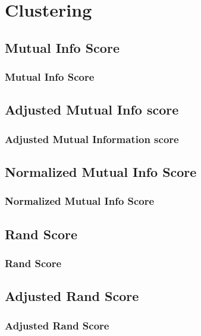 \chapter{Clustering}


\clearpage
\thispagestyle{clusteringstyle}
\section{Mutual Info Score}
\subsection{Mutual Info Score}

\clearpage
\thispagestyle{clusteringstyle}
\section{Adjusted Mutual Info score}
\subsection{Adjusted Mutual Information score}

\clearpage
\thispagestyle{clusteringstyle}
\section{Normalized Mutual Info Score}
\subsection{Normalized Mutual Info Score}

\clearpage
\thispagestyle{clusteringstyle}
\section{Rand Score}
\subsection{Rand Score}

\clearpage
\thispagestyle{clusteringstyle}
\section{Adjusted Rand Score}
\subsection{Adjusted Rand Score}

